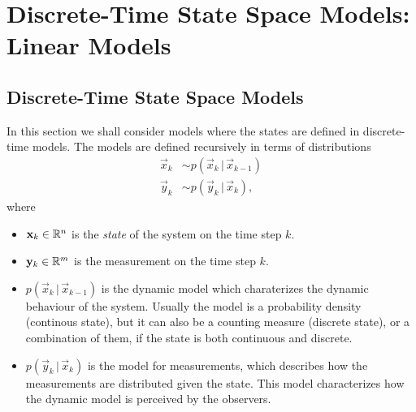 %
\chapter{Discrete-Time State Space Models: \\ Linear Models}
\label{ch:Linear-models}
%

\section{Discrete-Time State Space Models}

In this section we shall consider models where the states are defined
in discrete-time models. The models are defined recursively in terms
of distributions
%
\begin{equation}
\begin{split}
    \vec{x}_k &\sim p(\vec{x}_k\,|\,\vec{x}_{k-1}) \\
    \vec{y}_k &\sim p(\vec{y}_k\,|\,\vec{x}_k),
\end{split}
\label{eq:dss_model}
\end{equation}
%
where
%
\begin{itemize}
\item $\mathbf{x}_k \in \mathbb{R}^n$ is the {\em state} of the system on
  the time step $k$.
  
\item $\mathbf{y}_k \in \mathbb{R}^m$ is the measurement on the time step $k$.

\item $p(\vec{x}_k\,|\,\vec{x}_{k-1})$ is the dynamic model which
charaterizes the dynamic behaviour of the system. Usually the model is
a probability density (continous state), but it can also be a counting
measure (discrete state), or a combination of them, if the state is
both continuous and discrete.
%
\item $p(\vec{y}_k\,|\,\vec{x}_k)$ is the model for measurements,
which describes how the measurements are distributed given the
state. This model characterizes how the dynamic model is perceived by
the observers.
\end{itemize}

